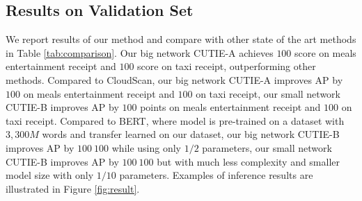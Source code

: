 \documentclass[10pt,twocolumn,letterpaper]{article}
\begin{document}
\subsection{Results on Validation Set}
We report results of our method and compare with other state of the art methods in Table \ref{tab:comparison}. Our big network CUTIE-A achieves $100$ score on meals entertainment receipt and $100$ score on taxi receipt, outperforming other methods. Compared to CloudScan, our big network CUTIE-A improves AP by $100$ on meals entertainment receipt and $100$ on taxi receipt, our small network CUTIE-B improves AP by $100$ points on meals entertainment receipt and $100$ on taxi receipt. Compared to BERT, where model is pre-trained on a dataset with $3,300M$ words and transfer learned on our dataset, our big network CUTIE-B improves AP by $100~100$ while using only $1/2$ parameters, our small network CUTIE-B improves AP by $100~100$ but with much less complexity and smaller model size with only $1/10$ parameters. Examples of inference results are illustrated in Figure \ref{fig:result}. 
\end{document}

